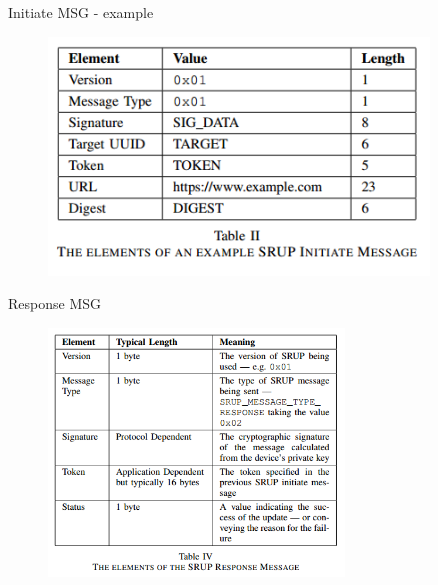 \documentclass{beamer}
\begin{document}
\begin{frame}{Initiate MSG - example}
    \begin{figure}[t]
        \centering
        \includegraphics[width=0.9\textwidth]{figures/table2.png}
    \end{figure}
\end{frame}

\begin{frame}{Response MSG}
    \begin{figure}[t]
        \centering
        \includegraphics[width=0.7\textwidth]{figures/table4.png}
    \end{figure}
\end{frame}
\end{document}
